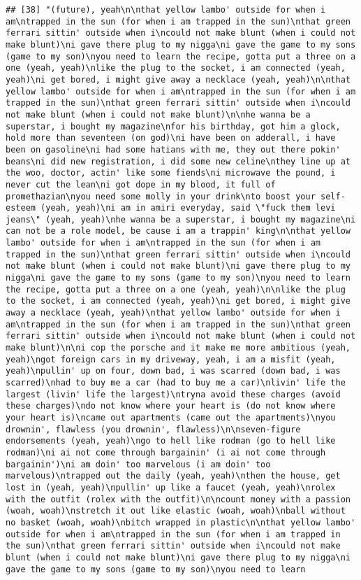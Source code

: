 \documentclass[]{article}
\begin{document}
\begin{verbatim}
## [38] "(future), yeah\n\nthat yellow lambo' outside for when i am\ntrapped in the sun (for when i am trapped in the sun)\nthat green ferrari sittin' outside when i\ncould not make blunt (when i could not make blunt)\ni gave there plug to my nigga\ni gave the game to my sons (game to my son)\nyou need to learn the recipe, gotta put a three on a one (yeah, yeah)\nlike the plug to the socket, i am connected (yeah, yeah)\ni get bored, i might give away a necklace (yeah, yeah)\n\nthat yellow lambo' outside for when i am\ntrapped in the sun (for when i am trapped in the sun)\nthat green ferrari sittin' outside when i\ncould not make blunt (when i could not make blunt)\n\nhe wanna be a superstar, i bought my magazine\nfor his birthday, got him a glock, hold more than seventeen (on god)\ni have been on adderall, i have been on gasoline\ni had some hatians with me, they out there pokin' beans\ni did new registration, i did some new celine\nthey line up at the woo, doctor, actin' like some fiends\ni microwave the pound, i never cut the lean\ni got dope in my blood, it full of promethazian\nyou need some molly in your drink\nto boost your self-esteem (yeah, yeah)\ni am in amiri everyday, said \"fuck them levi jeans\" (yeah, yeah)\nhe wanna be a superstar, i bought my magazine\ni can not be a role model, be cause i am a trappin' king\n\nthat yellow lambo' outside for when i am\ntrapped in the sun (for when i am trapped in the sun)\nthat green ferrari sittin' outside when i\ncould not make blunt (when i could not make blunt)\ni gave there plug to my nigga\ni gave the game to my sons (game to my son)\nyou need to learn the recipe, gotta put a three on a one (yeah, yeah)\n\nlike the plug to the socket, i am connected (yeah, yeah)\ni get bored, i might give away a necklace (yeah, yeah)\nthat yellow lambo' outside for when i am\ntrapped in the sun (for when i am trapped in the sun)\nthat green ferrari sittin' outside when i\ncould not make blunt (when i could not make blunt)\n\ni cop the porsche and it make me more ambitious (yeah, yeah)\ngot foreign cars in my driveway, yeah, i am a misfit (yeah, yeah)\npullin' up on four, down bad, i was scarred (down bad, i was scarred)\nhad to buy me a car (had to buy me a car)\nlivin' life the largest (livin' life the largest)\ntryna avoid these charges (avoid these charges)\ndo not know where your heart is (do not know where your heart is)\ncame out apartments (came out the apartments)\nyou drownin', flawless (you drownin', flawless)\n\nseven-figure endorsements (yeah, yeah)\ngo to hell like rodman (go to hell like rodman)\ni ai not come through bargainin' (i ai not come through bargainin')\ni am doin' too marvelous (i am doin' too marvelous)\ntrapped out the daily (yeah, yeah)\nthen the house, get lost in (yeah, yeah)\npullin' up like a faucet (yeah, yeah)\nrolex with the outfit (rolex with the outfit)\n\ncount money with a passion (woah, woah)\nstretch it out like elastic (woah, woah)\nball without no basket (woah, woah)\nbitch wrapped in plastic\n\nthat yellow lambo' outside for when i am\ntrapped in the sun (for when i am trapped in the sun)\nthat green ferrari sittin' outside when i\ncould not make blunt (when i could not make blunt)\ni gave there plug to my nigga\ni gave the game to my sons (game to my son)\nyou need to learn 
\end{verbatim}
\end{document}
